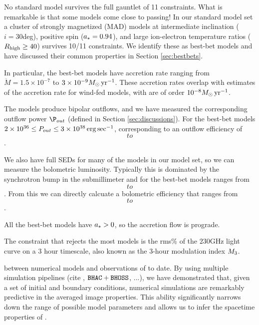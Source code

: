No standard model survives the full gauntlet of 11 constraints.  What is remarkable is that some models come close to passing!  In our standard model set a cluster of strongly magnetized (MAD) models at intermediate inclination ($i = 30$deg), positive spin ($a_* = 0.94$), and large  ion-electron temperature ratios ($R_\mathrm{high} \ge 40$) survives 10/11 constraints.  We identify these as best-bet models and have discussed their common properties in Section \ref{sec:bestbets}.

In particular, the best-bet models have accretion rate ranging from $\dot{M} = 1.5 \times 10^{-7}$ to $3 \times 10^{-9} M_\odot \,\mathrm{yr}^{-1}$.  These accretion rates overlap with estimates of the accretion rate for wind-fed models, with are of order $10^{-8} M_\odot\,\mathrm{yr}^{-1}$.  

The models produce bipolar outflows, and we have measured the corresponding outflow power $\P_{out}$ (defined in Section \ref{sec:discussions}).  For the best-bet models $2 \times 10^{36} \le P_{out} \le 3 \times 10^{38} \,\mathrm{erg} \,\mathrm{sec}^{-1}$, corresponding to an outflow efficiency of $$ to $$.  

We also have full SEDs for many of the models in our model set, so we can measure the bolometric luminosity.  Typically this is dominated by the synchrotron bump in the submillimeter and for the best-bet models ranges from $$ to $$.  From this we can directly calcuate a bolometric efficiency that ranges from $$ to $$.

All the best-bet models have $a_* > 0$, so the accretion flow is prograde.   

The constraint that rejects the most models is the rms\% of the $230$GHz light curve on a 3 hour timescale, also known as the 3-hour modulation index $M_{3}$.


between numerical models and observations of \sgra to date.
By using multiple simulation pipelines (cite \patoka, $\texttt{BHAC}+\texttt{BHOSS}$,
...), we have demonstrated that, given a set of initial and boundary
conditions, numerical simulations are remarkably predictive in the
averaged image properties.
This ability significantly narrows down the range of possible model
parameters and allows us to infer the spacetime properties of \sgra
{}.

